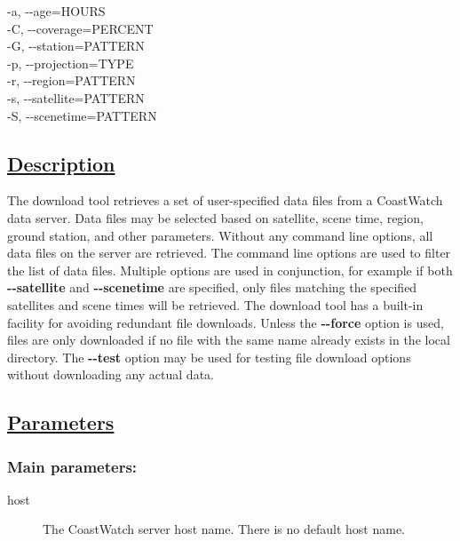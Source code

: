   -a, -{-}age=HOURS \\ 
 -C, -{-}coverage=PERCENT \\ 
 -G, -{-}station=PATTERN \\ 
 -p, -{-}projection=TYPE \\ 
 -r, -{-}region=PATTERN \\ 
 -s, -{-}satellite=PATTERN \\ 
 -S, -{-}scenetime=PATTERN \\ 

\subsection*{\underline{Description}}


  The download tool retrieves a set of user-specified data files from a CoastWatch data server. Data files may be selected based on satellite, scene time, region, ground station, and other parameters. Without any command line options, all data files on the server are retrieved. The command line options are used to filter the list of data files. Multiple options are used in conjunction, for example if both \textbf{-{-}satellite}
 and \textbf{-{-}scenetime}
 are specified, only files matching the specified satellites and scene times will be retrieved. The download tool has a built-in facility for avoiding redundant file downloads. Unless the \textbf{-{-}force}
 option is used, files are only downloaded if no file with the same name already exists in the local directory. The \textbf{-{-}test}
 option may be used for testing file download options without downloading any actual data. 
\subsection*{\underline{Parameters}}
\subsubsection*{Main parameters:}
\begin{description}
\item[ host ] The CoastWatch server host name. There is no default host name. 

\end{description}

